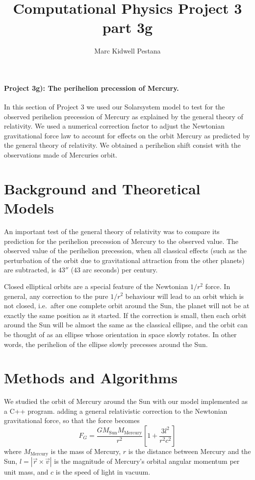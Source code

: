\documentclass[10pt,showpacs,preprintnumbers,footinbib,amsmath,amssymb,aps,prl,twocolumn,groupedaddress,superscriptaddress,showkeys]{revtex4-1}
\begin{document}
\title[CPP2]{Computational Physics Project 3 part 3g}

\author{Marc Kidwell Pestana}

\maketitle
\paragraph{Project 3g): The perihelion precession of Mercury.}
In this section of Project 3 we used our Solarsystem model to test for the  observed perihelion 
precession of Mercury as explained by the general theory of relativity. We used a numerical correction factor to adjust the Newtonian gravitational force law to account for effects on the orbit Mercury as predicted by the general theory of relativity. We obtained a perihelion shift consist with  the observations made of Mercuries orbit.

\section{Background and Theoretical Models}
An important test of the general theory of relativity was to compare its prediction for the
perihelion precession of Mercury to the observed value. The observed value of the perihelion precession, when
all classical effects (such as the perturbation of the orbit due to gravitational attraction from the other planets) are
subtracted, is $43''$ ($43$ arc seconds) per century.

Closed elliptical orbits are a special feature of the Newtonian $1/r^2$ force. In general, any correction to the
pure $1/r^2$ behaviour will lead to an orbit which is not closed, i.e.~after one complete orbit around the Sun, the
planet will not be at exactly the same position as it started. If the correction is small, then each orbit around
the Sun will be almost the same as the classical ellipse, and the orbit can be thought of as an ellipse whose 
orientation in space slowly rotates. In other words, the perihelion of the ellipse slowly precesses around the Sun.

\section{Methods and Algorithms}
We studied the orbit of Mercury around the Sun with our model implemented as a C++ program. adding a general relativistic correction to the Newtonian
gravitational force, so that the force becomes
\[
F_G = \frac{GM_\mathrm{Sun}M_\mathrm{Mercury}}{r^2}\left[1 + \frac{3l^2}{r^2c^2}\right]
\]
where $M_\mathrm{Mercury}$ is the mass of Mercury, $r$ is the distance between Mercury and the Sun, $l=|\vec{r}\times\vec{v}|$ is the magnitude of Mercury's orbital angular momentum per unit mass, 
and $c$ is the speed of light in vacuum.
\end{document}
